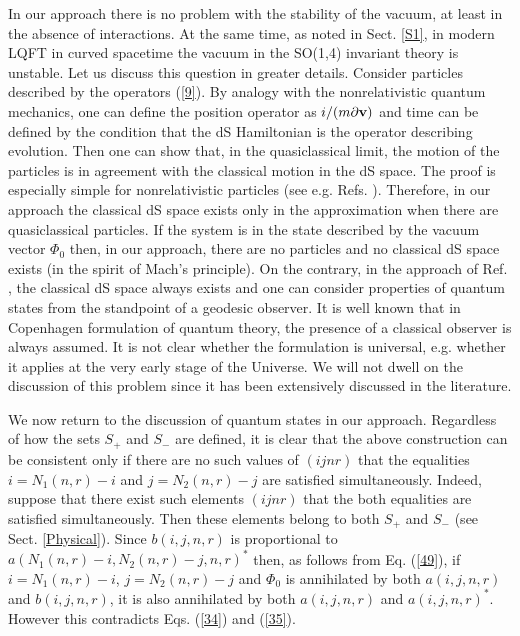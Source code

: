 \documentclass[a4paper,12pt]{article}%
\begin{document}
In our approach there is no problem with the stability
of the vacuum, at least in the absence of interactions.
At the same time, as noted in Sect. \ref{S1}, in modern
LQFT in curved spacetime \cite{Narlikar} the vacuum in 
the SO(1,4) invariant theory is unstable. Let us 
discuss this question in greater details. 
Consider particles described by the operators (\ref{9}).
By analogy with the nonrelativistic quantum mechanics, 
one can define the position operator as 
$i/(m \partial {\bf v})$
and time can be defined by the condition that the dS
Hamiltonian is the operator describing evolution. 
Then one can show that, in the quasiclassical limit, the 
motion of the particles is in agreement with the 
classical motion in the dS space. The proof is 
especially simple for nonrelativistic particles 
(see e.g. Refs. 
\cite{lev1,lev1a,lev3}). Therefore, in our approach 
the classical dS space exists only in the approximation
when there are quasiclassical particles. If the system
is in the state described by the vacuum vector $\Phi_0$
then, in our approach, there are no particles and no 
classical dS space exists (in the spirit of Mach's principle). 
On the contrary, in the approach of Ref. \cite{Narlikar},
the classical dS space always exists and one can consider
properties of quantum states from the standpoint of a
geodesic observer. It is well known that in Copenhagen 
formulation of quantum theory, the presence of
a classical observer is always assumed. It is not clear 
whether the formulation is universal, e.g. whether it applies
at the very early stage of the Universe. We will not dwell
on the discussion of this problem since it has 
been extensively discussed in the literature.
 
We now return to the discussion of quantum states in our
approach.
Regardless of how the sets $S_+$ and $S_-$ are
defined, it is clear that the above construction
can be consistent only if there are no such values
of $(ijnr)$ that the equalities $i=N_1(n,r)-i$
and $j=N_2(n,r)-j$ are satisfied simultaneously.
Indeed, suppose that there exist such elements
$(ijnr)$ that the both equalities are satisfied
simultaneously. Then these elements belong to
both $S_+$ and $S_-$ (see Sect. \ref{Physical}).
Since $b(i,j,n,r)$ is proportional to
$a(N_1(n,r)-i,N_2(n,r)-j,n,r)^*$ then, as follows
from Eq. (\ref{49}), if $i=N_1(n,r)-i$, 
$j=N_2(n,r)-j$ and $\Phi_0$
is annihilated by both $a(i,j,n,r)$ and 
$b(i,j,n,r)$, it is also annihilated by both
$a(i,j,n,r)$ and $a(i,j,n,r)^*$. However this
contradicts Eqs. (\ref{34}) and (\ref{35}).   
\end{document}
